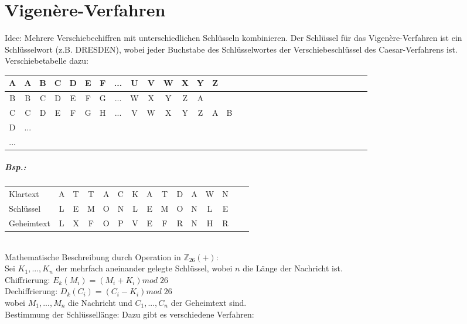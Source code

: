\documentclass{scrreprt}
\begin{document}
\section{Vigenère-Verfahren}
Idee: Mehrere Verschiebechiffren mit unterschiedlichen Schlüsseln kombinieren. Der Schlüssel für das Vigenère-Verfahren ist ein Schlüsselwort (z.B. DRESDEN), wobei jeder Buchstabe des Schlüsselwortes der Verschiebeschlüssel des Caesar-Verfahrens ist.\\
Verschiebetabelle dazu:\\
\begin{tabular}{ c| c c c c c c c c c c c c c c c c c c c c c c c c c c c c c c}
A&A&B&C&D&E&F&...&U&V&W&X&Y&Z\\
\hline
B & B & C & D & E &F& G& ...   & W & X & Y & Z &A\\
C & C &D&E&F&G&H&...&V&W&X&Y&Z&A&B\\
D & ...\\
...
\end{tabular}
\subparagraph{Bsp.:} \parskp
\begin{tabular}{l c c c c c c c c c c c c c c }
Klartext & A&T&T&A&C&K&A&T&D&A&W&N\\
Schlüssel & L&E&M&O&N&L&E&M&O&N&L&E\\
Geheimtext & L&X&F&O&P&V&E&F&R&N&H&R
\end{tabular}\\
Mathematische Beschreibung durch Operation in $\mathbb{Z}_{26}(+)$:\\
Sei $K_1, ... ,K_n$ der mehrfach aneinander gelegte Schlüssel, wobei $n$ die Länge der Nachricht ist.\\
Chiffrierung: $E_k(M_i)=(M_i+K_i)mod\;26$\\
Dechiffrierung: $D_k(C_i)=(C_i-K_i)mod \; 26$\\
wobei $M_1, ..., M_n$ die Nachricht und $C_1, ..., C_n$ der Geheimtext sind.\\
Bestimmung der Schlüssellänge: Dazu gibt es verschiedene Verfahren:
\end{document}
